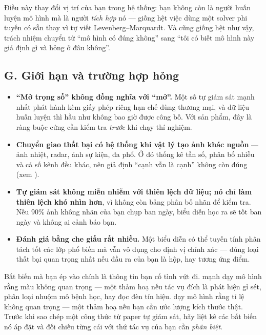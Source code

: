 \documentclass[../../../deep_learning.tex]{subfiles}
\begin{document}
Điều này thay đổi vị trí của bạn trong hệ thống: bạn không còn là người huấn luyện mô hình mà là người \emph{tích hợp} nó --- giống hệt việc dùng một solver phi tuyến có sẵn thay vì tự viết Levenberg--Marquardt. Và cũng giống hệt như vậy, trách nhiệm chuyển từ ``mô hình có đúng không'' sang ``tôi có biết mô hình này giả định gì và hỏng ở đâu không''.

\subsection{G. Giới hạn và trường hợp hỏng}
\begin{itemize}
\item \textbf{``Mở trọng số'' không đồng nghĩa với ``mở''.} Một số  tự giám sát mạnh nhất phát hành kèm giấy phép riêng hạn chế dùng thương mại, và dữ liệu huấn luyện thì hầu như không bao giờ được công bố. Với sản phẩm, đây là ràng buộc cứng cần kiểm tra \emph{trước} khi chạy thí nghiệm.
\item \textbf{Chuyển giao thất bại có hệ thống khi vật lý tạo ảnh khác nguồn} --- ảnh nhiệt, radar, ảnh sự kiện, đa phổ. Ở đó thống kê tần số, phân bố nhiễu và cả số kênh đều khác, nên giả định ``cạnh vẫn là cạnh'' không còn đúng (xem ).
\item \textbf{Tự giám sát không miễn nhiễm với thiên lệch dữ liệu; nó chỉ làm thiên lệch khó nhìn hơn}, vì không còn bảng phân bố nhãn để kiểm tra. Nếu 90\% ảnh không nhãn của bạn chụp ban ngày, biểu diễn học ra sẽ tốt ban ngày và không ai cảnh báo bạn.
\item \textbf{Đánh giá bằng  che giấu rất nhiều.} Một biểu diễn có thể tuyến tính phân tách tốt các lớp phổ biến mà vẫn vô dụng cho định vị chính xác --- đúng loại thất bại quan trọng nhất nếu đầu ra của bạn là hộp,  hay tương ứng điểm.
\end{itemize}

\begin{cambay}
Bất biến mà bạn ép vào  chính là thông tin bạn cố tình vứt đi.  mạnh dạy mô hình rằng màu không quan trọng --- một thảm hoạ nếu tác vụ đích là phát hiện gỉ sét, phân loại nhuộm mô bệnh học, hay đọc đèn tín hiệu.  dạy mô hình rằng tỉ lệ không quan trọng --- một thảm hoạ nếu bạn cần ước lượng kích thước thật. Trước khi sao chép một công thức  từ paper tự giám sát, hãy liệt kê các bất biến nó áp đặt và đối chiếu từng cái với thứ tác vụ của bạn cần \emph{phân biệt}.
\end{cambay}
\end{document}
